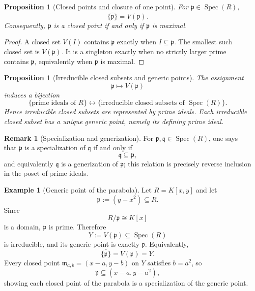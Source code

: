 \documentclass[12pt, a4paper]{article}
\newtheorem{proposition}[theorem]{Proposition}
\theoremstyle{definition}
\newtheorem{example}[theorem]{Example}
\newtheorem{remark}[theorem]{Remark}
\DeclareMathOperator{\Spec}{Spec}
\begin{document}
\begin{proposition}[Closed points and closure of one point]
For $\mathfrak p\in\Spec(R)$,
\[
\boxed{\overline{\{\mathfrak p\}}=V(\mathfrak p).}
\]
Consequently, $\mathfrak p$ is a closed point if and only if $\mathfrak p$ is maximal.
\end{proposition}

\begin{proof}
A closed set $V(I)$ contains $\mathfrak p$ exactly when $I\subseteq\mathfrak p$. The smallest such closed set is $V(\mathfrak p)$. It is a singleton exactly when no strictly larger prime contains $\mathfrak p$, equivalently when $\mathfrak p$ is maximal.
\end{proof}

\begin{proposition}[Irreducible closed subsets and generic points]
The assignment
\[
\mathfrak p\longmapsto V(\mathfrak p)
\]
induces a bijection
\[
\boxed{\{\text{prime ideals of }R\}\longleftrightarrow\{\text{irreducible closed subsets of }\Spec(R)\}.}
\]
Hence irreducible closed subsets are represented by prime ideals. Each irreducible closed subset has a unique generic point, namely its defining prime ideal.
\end{proposition}

\begin{remark}[Specialization and generization]
For $\mathfrak p,\mathfrak q\in\Spec(R)$, one says that $\mathfrak p$ is a specialization of $\mathfrak q$ if and only if
\[
\mathfrak q\subseteq \mathfrak p,
\]
and equivalently $\mathfrak q$ is a generization of $\mathfrak p$; this relation is precisely reverse inclusion in the poset of prime ideals.
\end{remark}

\begin{example}[Generic point of the parabola]
Let $R=K[x,y]$ and let
\[
\mathfrak p:=(y-x^2)\subseteq R.
\]
Since
\[
R/\mathfrak p\cong K[x]
\]
is a domain, $\mathfrak p$ is prime. Therefore
\[
Y:=V(\mathfrak p)\subseteq \Spec(R)
\]
is irreducible, and its generic point is exactly $\mathfrak p$. Equivalently,
\[
\overline{\{\mathfrak p\}}=V(\mathfrak p)=Y.
\]
Every closed point $\mathfrak m_{a,b}=(x-a,y-b)$ on $Y$ satisfies $b=a^2$, so
\[
\mathfrak p\subseteq (x-a,y-a^2),
\]
showing each closed point of the parabola is a specialization of the generic point.
\end{example}
\end{document}
